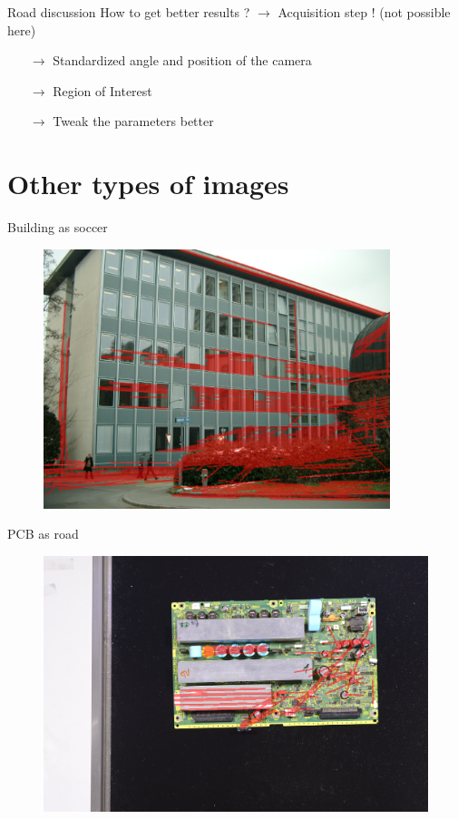 \documentclass[12pt]{beamer}
\begin{document}
\begin{frame}{Road discussion}
How to get better results ? $\longrightarrow$ Acquisition step ! (not possible here)
    \begin{itemize}
        \item[$\rightarrow$] Standardized angle and position of the camera
        \item[$\rightarrow$] Region of Interest
        \item[$\rightarrow$] Tweak the parameters better
    \end{itemize}
\end{frame}

\section{Other types of images}

\begin{frame}{Building as soccer}
    \begin{figure}
        \includegraphics[width=0.9\textwidth]{resources/png/building_as_soccer.png}
    \end{figure}
\end{frame}

\begin{frame}{PCB as road}
    \begin{figure}
        \includegraphics[width=\textwidth]{resources/png/pcb_as_road.png}
    \end{figure}
\end{frame}
\end{document}
